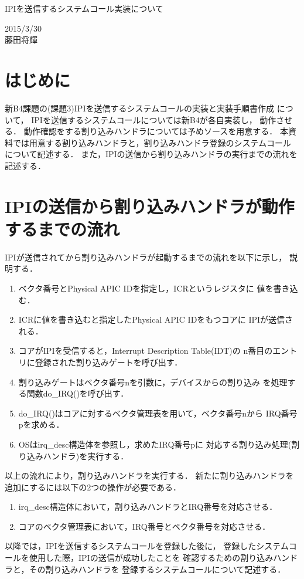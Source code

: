 \documentclass[12pt]{jsarticle}
\begin{document}

\begin{center}
{\LARGE IPIを送信するシステムコール実装について}
\end{center}

\begin{flushright}
  2015/3/30\\
  藤田将輝
\end{flushright}
\section{はじめに}
新B4課題の(課題3)IPIを送信するシステムコールの実装と実装手順書作成
について，
IPIを送信するシステムコールについては新B4が各自実装し，
動作させる．
動作確認をする割り込みハンドラについては予めソースを用意する．
本資料では用意する割り込みハンドラと，割り込みハンドラ登録のシステムコール
について記述する．
また，IPIの送信から割り込みハンドラの実行までの流れを記述する．
\section{IPIの送信から割り込みハンドラが動作するまでの流れ}
IPIが送信されてから割り込みハンドラが起動するまでの流れを以下に示し，
説明する．
\begin{enumerate}
	\item ベクタ番号とPhysical APIC IDを指定し，ICRというレジスタに
	      値を書き込む．
	\item ICRに値を書き込むと指定したPhysical APIC IDをもつコアに
              IPIが送信される．
	\item コアがIPIを受信すると，Interrupt Description Table(IDT)の
n番目のエントリに登録された割り込みゲートを呼び出す．
        \item 割り込みゲートはベクタ番号nを引数に，デバイスからの割り込み
を処理する関数do\_IRQ()を呼び出す．
	\item do\_IRQ()はコアに対するベクタ管理表を用いて，ベクタ番号nから
IRQ番号pを求める．
	\item OSはirq\_desc構造体を参照し，求めたIRQ番号pに
対応する割り込み処理(割り込みハンドラ)を実行する．
\end{enumerate}
以上の流れにより，割り込みハンドラを実行する．
新たに割り込みハンドラを追加にするには以下の2つの操作が必要である．
\begin{enumerate}
	\item irq\_desc構造体において，割り込みハンドラとIRQ番号を対応させる．
	\item コアのベクタ管理表において，IRQ番号とベクタ番号を対応させる．
\end{enumerate}	
以降では，IPIを送信するシステムコールを登録した後に，
登録したシステムコールを使用した際，IPIの送信が成功したことを
確認するための割り込みハンドラと，その割り込みハンドラを
登録するシステムコールについて記述する．
\end{document}
